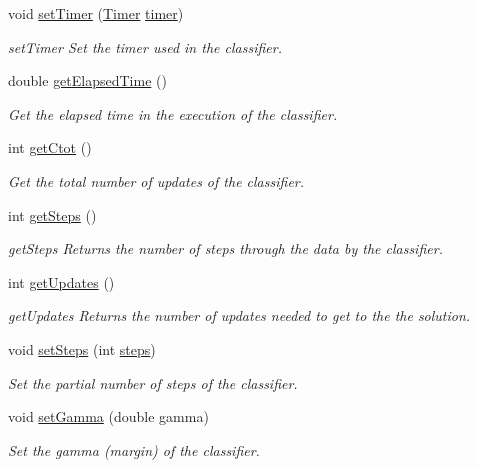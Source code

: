 \begin{DoxyCompactItemize}
void \mbox{\hyperlink{class_classifier_ad86224f59e1c7722fa34f63707bf0221}{set\+Timer}} (\mbox{\hyperlink{class_timer}{Timer}} \mbox{\hyperlink{class_classifier_a7426be6798e9a184e6d968f91a361a93}{timer}})
\begin{DoxyCompactList}\small\item\em set\+Timer Set the timer used in the classifier. \end{DoxyCompactList}\item 
double \mbox{\hyperlink{class_classifier_abbed7a8ea8050ae19a2c4c5f4a5e6002}{get\+Elapsed\+Time}} ()
\begin{DoxyCompactList}\small\item\em Get the elapsed time in the execution of the classifier. \end{DoxyCompactList}\item 
int \mbox{\hyperlink{class_classifier_aefd89af30ccd3e38194946bacecdf82a}{get\+Ctot}} ()
\begin{DoxyCompactList}\small\item\em Get the total number of updates of the classifier. \end{DoxyCompactList}\item 
int \mbox{\hyperlink{class_classifier_a6e6d5041d6945bc62581323d2d3b5ab1}{get\+Steps}} ()
\begin{DoxyCompactList}\small\item\em get\+Steps Returns the number of steps through the data by the classifier. \end{DoxyCompactList}\item 
int \mbox{\hyperlink{class_classifier_abde870e234b342455e113e05900f7339}{get\+Updates}} ()
\begin{DoxyCompactList}\small\item\em get\+Updates Returns the number of updates needed to get to the the solution. \end{DoxyCompactList}\item 
void \mbox{\hyperlink{class_classifier_a55c37a2a00b3dce578d6fde547376dae}{set\+Steps}} (int \mbox{\hyperlink{class_classifier_a154ed9ff7a3d989ed25dda7215289f64}{steps}})
\begin{DoxyCompactList}\small\item\em Set the partial number of steps of the classifier. \end{DoxyCompactList}\item 
void \mbox{\hyperlink{class_classifier_a8ce9a9a19a9deceb12e39e54ef595650}{set\+Gamma}} (double gamma)
\begin{DoxyCompactList}\small\item\em Set the gamma (margin) of the classifier. \end{DoxyCompactList}\item 

\end{DoxyCompactItemize}
